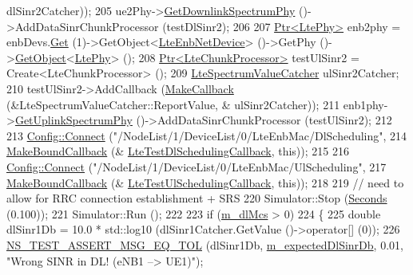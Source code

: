 \begin{DoxyCode}
      dlSinr2Catcher));
205   ue2Phy->\hyperlink{classns3_1_1LtePhy_a9560f8862545c7c5760e7f6737c5b938}{GetDownlinkSpectrumPhy} ()->AddDataSinrChunkProcessor (testDlSinr2);
206 
207   \hyperlink{classns3_1_1Ptr}{Ptr<LtePhy>} enb2phy = enbDevs.\hyperlink{classns3_1_1NetDeviceContainer_a677d62594b5c9d2dea155cc5045f4d0b}{Get} (1)->GetObject<\hyperlink{classns3_1_1LteEnbNetDevice}{LteEnbNetDevice}> ()->GetPhy
       ()->\hyperlink{classns3_1_1Object_a13e18c00017096c8381eb651d5bd0783}{GetObject}<\hyperlink{classns3_1_1LtePhy}{LtePhy}> ();
208   \hyperlink{classns3_1_1Ptr}{Ptr<LteChunkProcessor>} testUlSinr2 = Create<LteChunkProcessor> ();
209   \hyperlink{classns3_1_1LteSpectrumValueCatcher}{LteSpectrumValueCatcher} ulSinr2Catcher;
210   testUlSinr2->AddCallback (\hyperlink{group__makecallbackmemptr_ga9376283685aa99d204048d6a4b7610a4}{MakeCallback} (&LteSpectrumValueCatcher::ReportValue, &
      ulSinr2Catcher));
211   enb1phy->\hyperlink{classns3_1_1LtePhy_aa17612c41d80653ed556431eedef4304}{GetUplinkSpectrumPhy} ()->AddDataSinrChunkProcessor (testUlSinr2);
212 
213   \hyperlink{group__config_ga4014f151241cd0939b6cb64409605736}{Config::Connect} (\textcolor{stringliteral}{"/NodeList/1/DeviceList/0/LteEnbMac/DlScheduling"},
214                    \hyperlink{group__makeboundcallback_ga1725d6362e6065faa0709f7c93f8d770}{MakeBoundCallback} (&
      \hyperlink{lte-test-interference_8cc_a8d6b465d93f1580062071ad34085009a}{LteTestDlSchedulingCallback}, \textcolor{keyword}{this}));
215 
216   \hyperlink{group__config_ga4014f151241cd0939b6cb64409605736}{Config::Connect} (\textcolor{stringliteral}{"/NodeList/1/DeviceList/0/LteEnbMac/UlScheduling"},
217                    \hyperlink{group__makeboundcallback_ga1725d6362e6065faa0709f7c93f8d770}{MakeBoundCallback} (&
      \hyperlink{lte-test-interference_8cc_a3af9ca9e1f1a2d5c2688b18891d5a9da}{LteTestUlSchedulingCallback}, \textcolor{keyword}{this}));
218 
219 \textcolor{comment}{// need to allow for RRC connection establishment + SRS}
220   Simulator::Stop (\hyperlink{group__timecivil_ga33c34b816f8ff6628e33d5c8e9713b9e}{Seconds} (0.100));
221   Simulator::Run ();
222 
223   \textcolor{keywordflow}{if} (\hyperlink{classLteInterferenceTestCase_a30cae7c88e7a397b7e0f5391f25d165a}{m\_dlMcs} > 0)
224     \{
225       \textcolor{keywordtype}{double} dlSinr1Db = 10.0 * std::log10 (dlSinr1Catcher.GetValue ()->operator[] (0));
226       \hyperlink{group__testing_ga9e7861b56b4e70db3b56044cb7a28e41}{NS\_TEST\_ASSERT\_MSG\_EQ\_TOL} (dlSinr1Db, 
      \hyperlink{classLteInterferenceTestCase_a2524e1bc84780c6e3df394e9650d9e10}{m\_expectedDlSinrDb}, 0.01, \textcolor{stringliteral}{"Wrong SINR in DL! (eNB1 --> UE1)"});

\end{DoxyCode}
